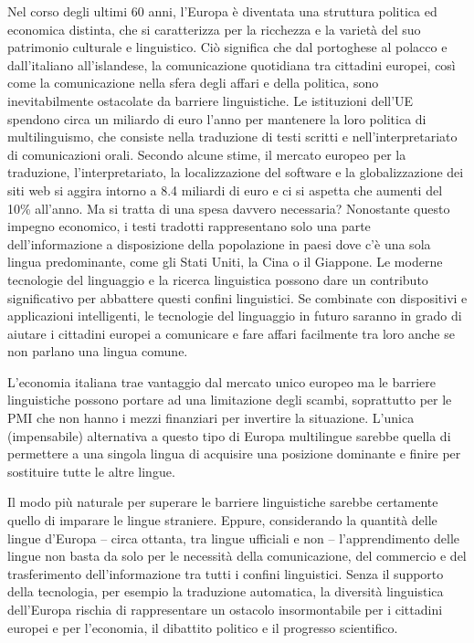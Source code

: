 \begin{multicols}{2}
  Nel corso degli ultimi 60 anni, l'Europa \`{e} diventata una struttura politica ed economica distinta, che si caratterizza per la ricchezza e la variet\`{a} del suo patrimonio culturale e linguistico. Ci\`{o} significa che dal portoghese al polacco e dall'italiano all'islandese, la comunicazione quotidiana tra cittadini europei, cos\`{i} come la comunicazione nella sfera degli affari e della politica, sono inevitabilmente ostacolate da barriere linguistiche. Le istituzioni dell'UE spendono circa un miliardo di euro l'anno per mantenere la loro politica di multilinguismo, che consiste nella traduzione di testi scritti e nell'interpretariato di comunicazioni orali.  Secondo alcune stime, il mercato europeo per la traduzione, l'interpretariato, la localizzazione del software e la globalizzazione dei siti web si aggira intorno a 8.4 miliardi di euro e ci si aspetta che aumenti del 10\% all'anno.  Ma si tratta di una spesa davvero necessaria?  Nonostante questo impegno economico, i testi tradotti rappresentano solo una parte dell'informazione a disposizione della popolazione in paesi dove c'\`{e} una sola lingua predominante, come gli Stati Uniti, la Cina o il Giappone.  Le moderne tecnologie del linguaggio e la ricerca linguistica possono dare un contributo significativo per abbattere questi confini linguistici. Se combinate con dispositivi e applicazioni intelligenti, le tecnologie del linguaggio in futuro saranno in grado di aiutare i cittadini europei a comunicare e fare affari facilmente tra loro anche se non parlano una lingua comune.

L'economia italiana trae vantaggio dal mercato unico europeo ma le barriere linguistiche possono portare ad una limitazione degli scambi, soprattutto per le PMI che non hanno i mezzi finanziari per invertire la situazione. L'unica (impensabile) alternativa a questo tipo di Europa multilingue sarebbe quella di permettere a una singola lingua di acquisire una posizione dominante e finire per sostituire tutte le altre lingue.


Il modo pi\`{u} naturale per superare le barriere linguistiche sarebbe certamente quello di imparare le lingue straniere. Eppure, considerando la quantit\`{a} delle lingue d'Europa -- circa ottanta, tra lingue ufficiali e non -- l'apprendimento delle lingue non basta da solo per le necessit\`{a} della comunicazione, del commercio e del trasferimento dell'informazione tra tutti i confini linguistici.  Senza il supporto della tecnologia, per esempio la traduzione automatica, la diversit\`{a} linguistica dell'Europa rischia di rappresentare un ostacolo insormontabile per i cittadini europei e per l'economia, il dibattito politico e il progresso scientifico.


\end{multicols}
